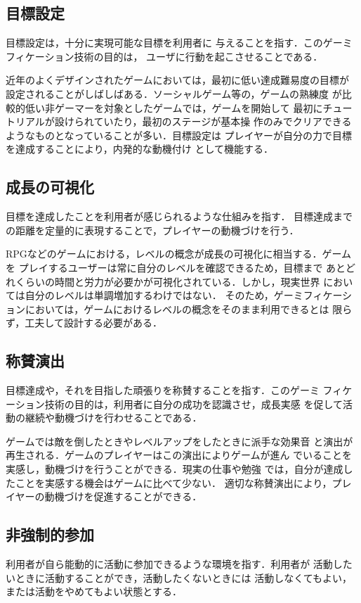 \documentclass{jreport}
\begin{document}
\subsection{目標設定}
目標設定は，十分に実現可能な目標を利用者に
与えることを指す．このゲーミフィケーション技術の目的は，
ユーザに行動を起こさせることである．

近年のよくデザインされたゲームにおいては，最初に低い達成難易度の目標が
設定されることがしばしばある．ソーシャルゲーム等の，ゲームの熟練度
が比較的低い非ゲーマーを対象としたゲームでは，ゲームを開始して
最初にチュートリアルが設けられていたり，最初のステージが基本操
作のみでクリアできるようなものとなっていることが多い．目標設定は
プレイヤーが自分の力で目標を達成することにより，内発的な動機付け
として機能する．

\subsection{成長の可視化}
\label{ssec:cansee}
目標を達成したことを利用者が感じられるような仕組みを指す．
目標達成までの距離を定量的に表現することで，プレイヤーの動機づけを行う．

RPGなどのゲームにおける，レベルの概念が成長の可視化に相当する．ゲームを
プレイするユーザーは常に自分のレベルを確認できるため，目標まで
あとどれくらいの時間と労力が必要かが可視化されている．しかし，現実世界
においては自分のレベルは単調増加するわけではない．
そのため，ゲーミフィケーションにおいては，ゲームにおけるレベルの概念をそのまま利用できるとは
限らず，工夫して設計する必要がある．

\subsection{称賛演出}
目標達成や，それを目指した頑張りを称賛することを指す．このゲーミ
フィケーション技術の目的は，利用者に自分の成功を認識させ，成長実感
を促して活動の継続や動機づけを行わせることである．

ゲームでは敵を倒したときやレベルアップをしたときに派手な効果音
と演出が再生される．ゲームのプレイヤーはこの演出によりゲームが進ん
でいることを実感し，動機づけを行うことができる．現実の仕事や勉強
では，自分が達成したことを実感する機会はゲームに比べて少ない．
適切な称賛演出により，プレイヤーの動機づけを促進することができる．

\subsection{非強制的参加}
利用者が自ら能動的に活動に参加できるような環境を指す．利用者が
活動したいときに活動することができ，活動したくないときには
活動しなくてもよい，または活動をやめてもよい状態とする．
\end{document}
